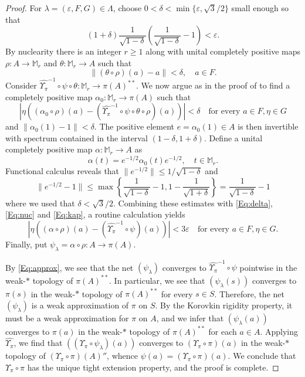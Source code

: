 \documentclass[10pt]{amsart}
\newcommand{\bM}{{\mathbb{M}}}
\newcommand{\eps}{\varepsilon}
\theoremstyle{definition}
\begin{document}
\begin{proof}
For $\lambda=(\eps,F,G)\in \Lambda$, choose $0<\delta<\min\{\eps,\sqrt{3}/2\}$ small enough so that 
\begin{equation}\label{Eq:delta}
(1+\delta) \frac{1}{\sqrt{1-\delta}} \left(\frac{1}{\sqrt{1-\delta}}-1\right)<\eps.
\end{equation}
By nuclearity there is an integer $r\geq 1$ along with unital completely positive maps $\rho:A\to \bM_r$ and $\theta:\bM_r\to A$ such that
\begin{equation}\label{Eq:nuc}
\|(\theta\circ \rho)(a)-a\|<\delta, \quad a\in F.
\end{equation}
Consider  $\widehat {\Upsilon_\pi}^{-1}\circ \psi\circ\theta:\bM_r\to \pi(A)^{**}$. We now argue as in the proof of \cite[Proposition 2.3.8]{brown2008textrm} to find a completely positive map $\alpha_0:\bM_r\to  \pi(A)$ such that
\begin{equation}\label{Eq:kap}
|\eta((\alpha_0 \circ \rho)(a)-(\widehat {\Upsilon_\pi}^{-1}\circ \psi\circ \theta\circ \rho)(a))|<\delta  \quad \text{for every } a\in F, \eta\in G
\end{equation}
and $\|\alpha_0(1)-1\|<\delta$. The positive element $e= \alpha_0(1)\in A$ is then invertible with spectrum contained  in the interval $(1-\delta,1+\delta)$. Define  a unital completely positive map $\alpha:\bM_r\to A$ as 
\[
\alpha(t)=e^{-1/2} \alpha_0(t)e^{-1/2},\quad t\in \bM_r.
\]
Functional calculus reveals that $\|e^{-1/2}\|\leq 1/\sqrt{1-\delta}$ and 
\[\|e^{-1/2}-1\|\leq \max\left\{\frac{1}{\sqrt{1-\delta}}-1,1-\frac{1}{\sqrt{1+\delta}}\right\}=\frac{1}{\sqrt{1-\delta}}-1
\]
where we used that $\delta<\sqrt{3}/2$.
Combining these estimates with \eqref{Eq:delta},\eqref{Eq:nuc} and \eqref{Eq:kap}, a routine calculation yields
\begin{equation}\label{Eq:approx}
|\eta((\alpha \circ \rho)(a)-(\widehat {\Upsilon_\pi}^{-1} \circ \psi)(a))|<3\eps \quad \text{for every } a\in F, \eta\in G.
\end{equation}
Finally, put $\psi_\lambda=\alpha\circ \rho:A\to \pi(A)$. 

By \eqref{Eq:approx}, we see that the net $(\psi_\lambda)$ converges to $\widehat {\Upsilon_\pi}^{-1}\circ \psi$ pointwise in the weak-$*$ topology of $\pi(A)^{**}$.  
In particular, we see that $( \psi_\lambda(s))$ converges to $\pi(s)$ in the weak-$*$ topology of $\pi(A)^{**}$ for every $s\in S$. Therefore, the net $( \psi_\lambda)$ is a weak approximation of $\pi$ on $S$. By the Korovkin rigidity property, it must be a weak approximation for $\pi$ on $A$, and we infer that $( \psi_\lambda(a))$ converges to $\pi(a)$ in the weak-$*$ topology of $\pi(A)^{**}$ for each $a\in A$. Applying $\widehat{\Upsilon_\pi}$, we find that $((\Upsilon_\pi\circ \psi_\lambda)(a))$ converges to $(\Upsilon_\pi\circ \pi)(a)$ in the weak-$*$ topology of $(\Upsilon_\pi\circ\pi)(A)''$, whence $\psi(a)=(\Upsilon_\pi\circ \pi)(a)$. We conclude that $\Upsilon_\pi\circ \pi$ has the unique tight extension property, and the proof is complete.
\end{proof}
\end{document}
